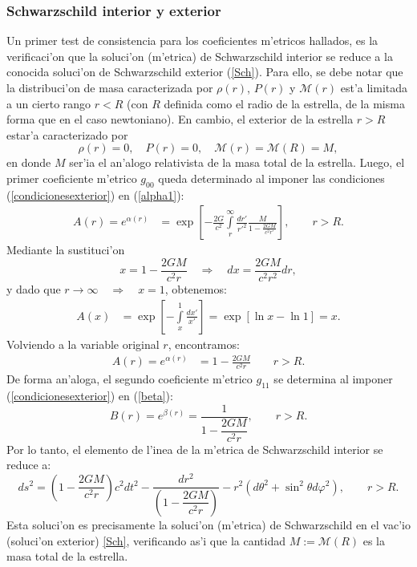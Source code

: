 \subsubsection{Schwarzschild interior y exterior}\label{sec:interiorexterior}
Un primer test de consistencia para los coeficientes m'etricos hallados, es la verificaci'on que la soluci'on (m'etrica) de Schwarzschild interior se reduce a la conocida soluci'on de Schwarzschild exterior (\ref{Sch}). Para ello, se debe notar que la distribuci'on de masa caracterizada por $\rho(r)$, $P(r)$ y $\mathcal{M}(r)$ est'a limitada a un cierto rango $r<R$ (con $R$ definida como el radio de la estrella, de la misma forma que en el caso newtoniano). En cambio, el exterior de la estrella $r>R$ estar'a caracterizado por
\begin{equation}\label{condicionesexterior}
 \rho(r)=0,\quad P(r)=0,\quad \mathcal{M}(r)=\mathcal{M}(R)=M,
\end{equation}
en donde $M$ ser'ia el an'alogo relativista de la masa total de la estrella.
Luego, el primer coeficiente m'etrico $g_{00}$ queda determinado al imponer las condiciones (\ref{condicionesexterior}) en (\ref{alpha1}):
\begin{align}\label{Arext1}
A(r)=e^{\alpha(r)}&=\exp{\left[-\frac{2G}{c^2}\int\limits_r^{\infty}\frac{dr'}{r'^2}\frac{M}{1-\frac{2GM}{c^2r'}}\right]},\qquad r>R.
\end{align}
Mediante la sustituci'on
\begin{equation}
x=1-\frac{2GM}{c^2r}\quad\Rightarrow\quad dx=\frac{2GM}{c^2r^2}dr,
\end{equation}
y dado que $r\to\infty\quad\Rightarrow\quad x=1$, obtenemos:
\begin{align}
A(x)&=\exp\left[-\int\limits_{x}^{1}\frac{dx'}{x'}\right]=\exp\left[\ln x-\ln 1\right]=x.
\end{align}
Volviendo a la variable original $r$, encontramos:
\begin{align} \label{Arext2}
A(r) =e^{\alpha(r)}&= 1-\frac{2GM}{c^2r}\qquad
\text{$r>R$}.
\end{align}
De forma an'aloga, el segundo coeficiente m'etrico $g_{11}$ se determina al imponer (\ref{condicionesexterior}) en (\ref{beta}):
\begin{equation}
 B(r)=e^{\beta(r)}=\dfrac{1}{1-\dfrac{2GM}{c^2r}},\qquad
\text{$r>R$}.
\end{equation}
Por lo tanto, el elemento de l'inea de la m'etrica de Schwarzschild interior se reduce a:
\begin{equation}
 ds^2=\left(1-\dfrac{2GM}{c^2r}\right)c^2dt^2-\dfrac{dr^2}{\left(1-\dfrac{2GM}{c^2r}\right)}-r^2(d\theta^2+\sin^2\theta d\varphi^2),\qquad
\text{$r>R$}.
\end{equation}
Esta soluci'on es precisamente la soluci'on (m'etrica) de Schwarzschild en el vac'io (soluci'on exterior) \eqref{Sch}, verificando as'i que la cantidad $M:=\mathcal{M}(R)$ es la masa total de la estrella.

